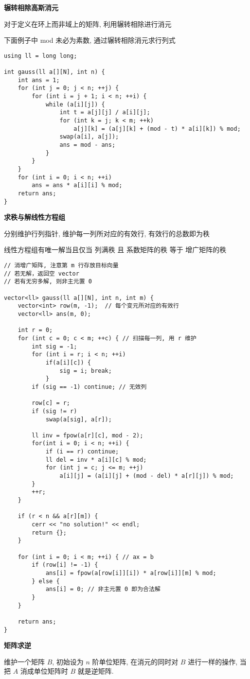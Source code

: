 \textbf{辗转相除高斯消元}

对于定义在环上而非域上的矩阵, 利用辗转相除进行消元

下面例子中 mod 未必为素数, 通过辗转相除消元求行列式

\begin{verbatim}
using ll = long long;

int gauss(ll a[][N], int n) {
    int ans = 1;
    for (int j = 0; j < n; ++j) {
        for (int i = j + 1; i < n; ++i) {
            while (a[i][j]) {
                int t = a[j][j] / a[i][j];
                for (int k = j; k < m; ++k)
                    a[j][k] = (a[j][k] + (mod - t) * a[i][k]) % mod; 
                swap(a[i], a[j]);
                ans = mod - ans;
            }
        }
    }
    for (int i = 0; i < n; ++i) 
        ans = ans * a[i][i] % mod;
    return ans;
}
\end{verbatim}

\textbf{求秩与解线性方程组}

分别维护行列指针, 维护每一列所对应的有效行, 有效行的总数即为秩

线性方程组有唯一解当且仅当 列满秩 且 系数矩阵的秩 等于 增广矩阵的秩

\begin{verbatim}
// 消增广矩阵, 注意第 m 行存放目标向量 
// 若无解，返回空 vector
// 若有无穷多解, 则非主元置 0

vector<ll> gauss(ll a[][N], int n, int m) {
    vector<int> row(m, -1);  // 每个变元所对应的有效行
    vector<ll> ans(m, 0);

    int r = 0;
    for (int c = 0; c < m; ++c) { // 扫描每一列, 用 r 维护
        int sig = -1;
        for (int i = r; i < n; ++i) 
            if(a[i][c]) {
                sig = i; break;
            }
        if (sig == -1) continue; // 无效列

        row[c] = r;
        if (sig != r) 
            swap(a[sig], a[r]);

        ll inv = fpow(a[r][c], mod - 2);
        for(int i = 0; i < n; ++i) {
            if (i == r) continue;
            ll del = inv * a[i][c] % mod;
            for (int j = c; j <= m; ++j) 
                a[i][j] = (a[i][j] + (mod - del) * a[r][j]) % mod; 
        }
        ++r;
    }
    
    if (r < n && a[r][m]) {
        cerr << "no solution!" << endl;
        return {};
    }

    for (int i = 0; i < m; ++i) { // ax = b
        if (row[i] != -1) {
            ans[i] = fpow(a[row[i]][i]) * a[row[i]][m] % mod;
        } else {
            ans[i] = 0; // 非主元置 0 即为合法解
        }
    }

    return ans;
}
\end{verbatim}

\textbf{矩阵求逆}

维护一个矩阵 $B$, 初始设为 $n$ 阶单位矩阵, 在消元的同时对 $B$ 进行一样的操作, 当把 $A$ 消成单位矩阵时 $B$ 就是逆矩阵.
